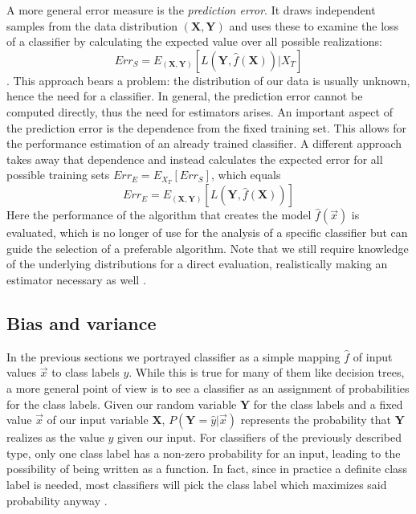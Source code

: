 A more general error measure is the \textit{prediction error}. It draws independent samples from the data distribution $(\mathbf{X}, \mathbf{Y})$ and uses these to examine the loss of a classifier by calculating the expected value over all possible realizations:
\begin{equation}
Err_{S} = E_{(\mathbf{X}, \mathbf{Y})}[L(\mathbf{Y}, \hat{f}(\mathbf{X})) | X_T]
\end{equation}
\cite{RodriguezEtAl2013}. This approach bears a problem: the distribution of our data is usually unknown, hence the need for a classifier. In general, the prediction error cannot be computed directly, thus the need for estimators arises.
An important aspect of the prediction error is the dependence from the fixed training set. This allows for the performance estimation of an already trained classifier. A different approach takes away that dependence and instead calculates the expected error for all possible training sets $Err_{E} = E_{X_T}[Err_{S}]$, which equals
\begin{equation}
Err_{E} = E_{(\mathbf{X}, \mathbf{Y})}[L(\mathbf{Y}, \hat{f}(\mathbf{X}))]
\end{equation}
Here the performance of the algorithm that creates the model $\hat{f}(\vec{x})$ is evaluated, which is no longer of use for the analysis of a specific classifier but can guide the selection of a preferable algorithm. Note that we still require knowledge of the underlying distributions for a direct evaluation, realistically making an estimator necessary as well \cite{HastieEtAl2009}.

\subsection{Bias and variance}
In the previous sections we portrayed classifier as a simple mapping $\hat{f}$ of input values $\vec{x}$ to class labels $y$. While this is true for many of them like decision trees, a more general point of view is to see a classifier as an assignment of probabilities for the class labels. Given our random variable $\mathbf{Y}$ for the class labels and a fixed value $\vec{x}$ of our input variable $\mathbf{X}$, $P(\mathbf{Y} = \hat{y} | \vec{x})$ represents the probability that $\mathbf{Y}$ realizes as the value $y$ given our input. For classifiers of the previously described type, only one class label has a non-zero probability for an input, leading to the possibility of being written as a function. In fact, since in practice a definite class label is needed, most classifiers will pick the class label which maximizes said probability anyway \cite{KohaviEtAl1996}.

